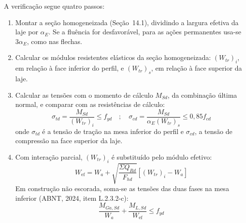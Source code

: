 \documentclass[11pt,a4paper]{article}
\begin{document}
A verificação segue quatro passos:
\begin{enumerate}
  \item Montar a seção homogeneizada (Seção~14.1), dividindo a largura efetiva da laje por $\alpha_E$. Se a fluência for desfavorável, para as ações permanentes usa-se $3\alpha_E$, como nas flechas.
  \item Calcular os módulos resistentes elásticos da seção homogeneizada: $(W_{tr})_i$, em relação à face inferior do perfil, e $(W_{tr})_s$, em relação à face superior da laje.
  \item Calcular as tensões com o momento de cálculo $M_{Sd}$, da combinação última normal, e comparar com as resistências de cálculo:
  \begin{equation}
    \sigma_{td} = \frac{M_{Sd}}{(W_{tr})_i} \le f_{yd} \quad ; \quad \sigma_{cd} = \frac{M_{Sd}}{\alpha_E (W_{tr})_s} \le 0{,}85 f_{cd}
    \label{eq:tensoes-elasticas}
  \end{equation}
  onde $\sigma_{td}$ é a tensão de tração na mesa inferior do perfil e $\sigma_{cd}$, a tensão de compressão na face superior da laje.
  \item Com interação parcial, $(W_{tr})_i$ é substituído pelo módulo efetivo:
  \begin{equation}
    W_{\text{ef}} = W_a + \sqrt{\frac{\Sigma Q_{Rd}}{F_{hd}}}\left[(W_{tr})_i - W_a\right]
    \label{eq:wef}
  \end{equation}
  Em construção não escorada, soma-se as tensões das duas fases na mesa inferior (ABNT, 2024, item L.2.3.2-c):
  \begin{equation}
    \frac{M_{Ga,Sd}}{W_a} + \frac{M_{L,Sd}}{W_{\text{ef}}} \le f_{yd}
    \label{eq:nao-escorada-semicompacta}
  \end{equation}
\end{enumerate}
\end{document}
